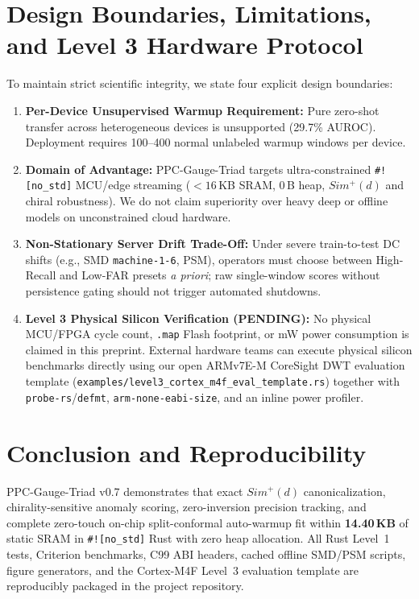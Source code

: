\documentclass[conference]{IEEEtran}
\begin{document}
\section{Design Boundaries, Limitations, and Level 3 Hardware Protocol}
To maintain strict scientific integrity, we state four explicit design boundaries:
\begin{enumerate}
  \item \textbf{Per-Device Unsupervised Warmup Requirement:} Pure zero-shot transfer across heterogeneous devices is unsupported (29.7\% AUROC). Deployment requires 100--400 normal unlabeled warmup windows per device.
  \item \textbf{Domain of Advantage:} PPC-Gauge-Triad targets ultra-constrained \texttt{\#![no\_std]} MCU/edge streaming ($<16$\,KB SRAM, 0\,B heap, $Sim^+(d)$ and chiral robustness). We do not claim superiority over heavy deep or offline models on unconstrained cloud hardware.
  \item \textbf{Non-Stationary Server Drift Trade-Off:} Under severe train-to-test DC shifts (e.g., SMD \texttt{machine-1-6}, PSM), operators must choose between High-Recall and Low-FAR presets \emph{a priori}; raw single-window scores without persistence gating should not trigger automated shutdowns.
  \item \textbf{Level 3 Physical Silicon Verification (\textbf{PENDING}):} No physical MCU/FPGA cycle count, \texttt{.map} Flash footprint, or mW power consumption is claimed in this preprint. External hardware teams can execute physical silicon benchmarks directly using our open ARMv7E-M CoreSight DWT evaluation template (\texttt{examples/level3\_cortex\_m4f\_eval\_template.rs}) together with \texttt{probe-rs}/\texttt{defmt}, \texttt{arm-none-eabi-size}, and an inline power profiler.
\end{enumerate}

\section{Conclusion and Reproducibility}
PPC-Gauge-Triad v0.7 demonstrates that exact $Sim^+(d)$ canonicalization, chirality-sensitive anomaly scoring, zero-inversion precision tracking, and complete zero-touch on-chip split-conformal auto-warmup fit within \textbf{14.40\,KB} of static SRAM in \texttt{\#![no\_std]} Rust with zero heap allocation. All Rust Level~1 tests, Criterion benchmarks, C99 ABI headers, cached offline SMD/PSM scripts, figure generators, and the Cortex-M4F Level~3 evaluation template are reproducibly packaged in the project repository.
\end{document}
